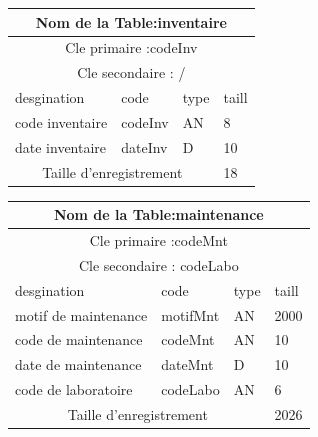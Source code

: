 \vspace{2cm}

\begin{tabular}{ |p{5cm}||p{4cm}|p{3cm}|p{3cm}|  }
    \hline
    \multicolumn{4}{|c|}{Nom de la Table:inventaire } \\
    \hline
    \multicolumn{4}{|c|}{Cle primaire :codeInv } \\
    \hline
    \multicolumn{4}{|c|}{Cle secondaire : / } \\
    \hline
    \hline
    desgination&code&type&taill \\
    \hline
    code inventaire&codeInv&AN&8 \\
    date inventaire&dateInv&D&10 \\
    \hline
    \hline
    \multicolumn{3}{|c|}{Taille d’enregistrement} & 18\\
    \hline
\end{tabular}

\vspace{2cm}

\begin{tabular}{ |p{5cm}||p{4cm}|p{3cm}|p{3cm}|  }
    \hline
    \multicolumn{4}{|c|}{Nom de la Table:maintenance } \\
    \hline
    \multicolumn{4}{|c|}{Cle primaire :codeMnt } \\
    \hline
    \multicolumn{4}{|c|}{Cle secondaire : codeLabo } \\
    \hline
    \hline
    desgination&code&type&taill \\
    \hline
    motif de maintenance&motifMnt&AN&2000 \\
    code de maintenance&codeMnt&AN&10 \\
    date de maintenance&dateMnt&D&10 \\
    code de laboratoire&codeLabo&AN&6 \\
    \hline
    \hline
    \multicolumn{3}{|c|}{Taille d’enregistrement} & 2026\\
    \hline
\end{tabular}

\vspace{2cm}

